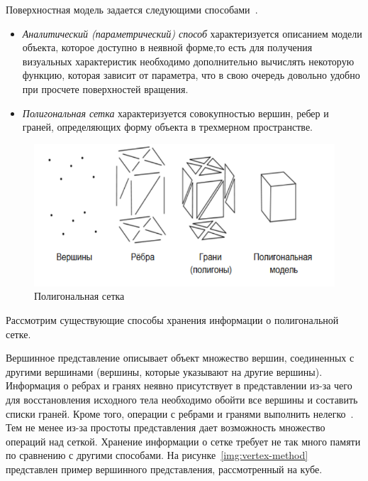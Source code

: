 Поверхностная модель задается следующими способами~\cite{roders, porev}.
\begin{itemize}
	\item \textit{Аналитический (параметрический) способ} характеризуется описанием модели объекта, которое доступно в неявной форме,то есть для получения визуальных характеристик необходимо дополнительно вычислять некоторую функцию, которая зависит от параметра, что в свою очередь довольно удобно при просчете поверхностей вращения. 
	\item \textit{Полигональная сетка} характеризуется совокупностью вершин, ребер и граней, определяющих форму объекта в трехмерном пространстве.
\end{itemize}

\begin{figure}[h]
	\centering
	\includegraphics[height=0.3\textheight]{img/polygonal-grid.png}
	\caption{Полигональная сетка}
	\label{img:polygonal-grid}
\end{figure}

Рассмотрим существующие способы хранения информации о полигональной сетке.

Вершинное представление описывает объект множество вершин, соединенных с другими вершинами (вершины, которые указывают на другие вершины). 
Информация о ребрах и гранях неявно присутствует в представлении из-за чего для восстановления исходного тела необходимо обойти все вершины и составить списки граней. 
Кроме того, операции с ребрами и гранями выполнить нелегко~\cite{aaymodelmethod}.
Тем не менее из-за простоты представления дает возможность множество операций над сеткой. 
Хранение информации о сетке требует не так много памяти по сравнению с другими способами.
На рисунке~\ref{img:vertex-method} представлен пример вершинного представления, рассмотренный на кубе.

